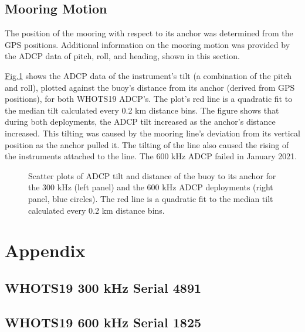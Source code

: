 \documentclass[a4paper,10pt,english,openany,oneside]{sphinxmanual}
\let\sphinxpxdimen\pdfpxdimen\else\newdimen\sphinxpxdimen
\begin{document}
\section{Mooring Motion}
\label{\detokenize{6_section:mooring-motion}}
\sphinxAtStartPar
The position of the mooring with respect to its anchor was determined from the
GPS positions. Additional information on the mooring motion was provided by the
ADCP data of pitch, roll, and heading, shown in this section.

\sphinxAtStartPar
\hyperref[\detokenize{6_section:wh19-adcp-tilt-png}]{Fig.\@ \ref{\detokenize{6_section:wh19-adcp-tilt-png}}} shows the ADCP data of the instrument’s tilt (a
combination of the pitch and roll), plotted against the buoy’s distance from
its anchor (derived from GPS positions), for both WHOTS\sphinxhyphen{}19 ADCP’s. The plot’s
red line is a quadratic fit to the median tilt calculated every 0.2 km distance
bins. The figure shows that during both deployments, the ADCP tilt increased as
the anchor’s distance increased. This tilting was caused by the mooring line’s
deviation from its vertical position as the anchor pulled it. The tilting of
the line also caused the rising of the instruments attached to the line. The
600 kHz ADCP failed in January 2021.

\begin{figure}[htbp]
\centering
\capstart

\noindent\sphinxincludegraphics[width=1000\sphinxpxdimen]{{wh19_adcp_tilt}.png}
\caption{Scatter plots of ADCP tilt and distance of the buoy to its anchor for the 300
kHz (left panel) and the 600 kHz ADCP deployments (right panel, blue circles).
The red line is a quadratic fit to the median tilt calculated every 0.2 km
distance bins.}\label{\detokenize{6_section:wh19-adcp-tilt-png}}\end{figure}


\chapter{Appendix}
\label{\detokenize{appendices:appendix}}\label{\detokenize{appendices::doc}}

\section{WHOTS\sphinxhyphen{}19 300 kHz \sphinxhyphen{} Serial 4891}
\label{\detokenize{appendices:whots-19-300-khz-serial-4891}}

\section{WHOTS\sphinxhyphen{}19 600 kHz \sphinxhyphen{} Serial 1825}
\label{\detokenize{appendices:whots-19-600-khz-serial-1825}}
\begingroup
\renewcommand\chapter[1]{\endgroup}
\end{document}
